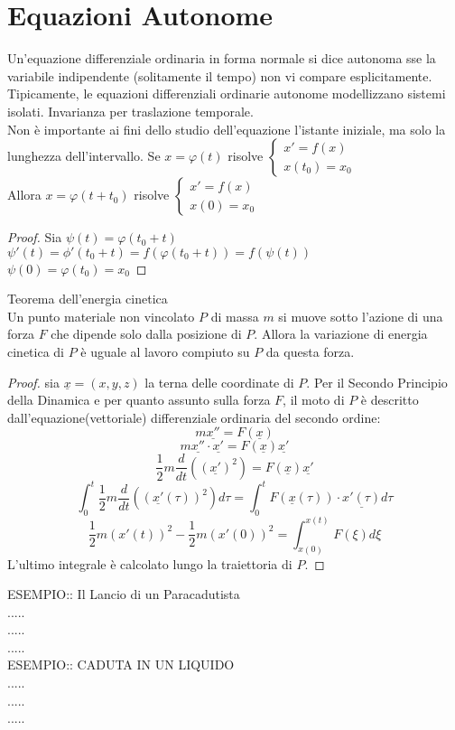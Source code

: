 \section{Equazioni Autonome}
Un'equazione differenziale ordinaria in forma normale si dice autonoma sse la variabile indipendente (solitamente il tempo) non vi compare esplicitamente.
\observation
Tipicamente, le equazioni differenziali ordinarie autonome modellizzano sistemi isolati.
\observation Invarianza per traslazione temporale.\\
Non è importante ai fini dello studio dell'equazione l'istante iniziale, ma solo la lunghezza dell'intervallo.
Se  $x=\varphi(t)$ risolve $\left\{ \begin{matrix}  x' = f(x)\\x(t_0)=x_0 \end{matrix} \right.$\\
Allora $x=\varphi(t+t_0)$ risolve $\left\{ \begin{matrix}  x' = f(x)\\x(0)=x_0 \end{matrix} \right.$\\
\begin{proof}
	Sia $\psi(t)=\varphi(t_0+t)$\\
	$ \psi'(t)= \phi'(t_0+t)=f(\varphi(t_0+t))=f(\psi(t))$\\
	$\psi(0)=\varphi(t_0)=x_0$ 
\end{proof}
\proposition Teorema dell'energia cinetica\\
Un punto materiale non vincolato $P$ di massa $m$ si muove sotto l'azione di una forza $F$ che dipende solo dalla posizione di $P$. Allora la variazione di energia cinetica di $P$ è uguale al lavoro compiuto su $P$ da questa forza.
\begin{proof}
	sia $\underline{x}=(x,y,z)$ la terna delle coordinate di $P$. Per il Secondo Principio della Dinamica e per quanto assunto sulla forza $F$, il moto di $P$ è descritto dall'equazione(vettoriale) differenziale ordinaria del secondo ordine:\\
	$$m \underline{x''}=F(\underline{x})$$
	$$m \underline{x''}\cdot \underline{x'}=F(\underline{x}) \underline{x'}$$
	$$\frac{1}{2}m\frac{d}{dt}\left(\left( \underline{x'}\right)^2\right)=F(\underline{x}) \underline{x'}$$
	$$\int_{0}^t\frac{1}{2}m\frac{d}{dt}\left(\left( \underline{x'}(\tau)\right)^2\right)d\tau=\int_{0}^tF(\underline{x}(\tau))\cdot \underline{x'(\tau)}d\tau$$
	$$\frac{1}{2}m\left( x'(t)\right)^2-\frac{1}{2}m\left( x'(0)\right)^2 = \int_{x(0)}^{x(t)}F(\xi)d\xi$$
	L'ultimo integrale è calcolato lungo la traiettoria di $P$.
\end{proof}
ESEMPIO:: Il Lancio di un Paracadutista\\
.....\\
.....\\
.....\\
ESEMPIO:: CADUTA IN UN LIQUIDO\\
.....\\
.....\\
.....\\
